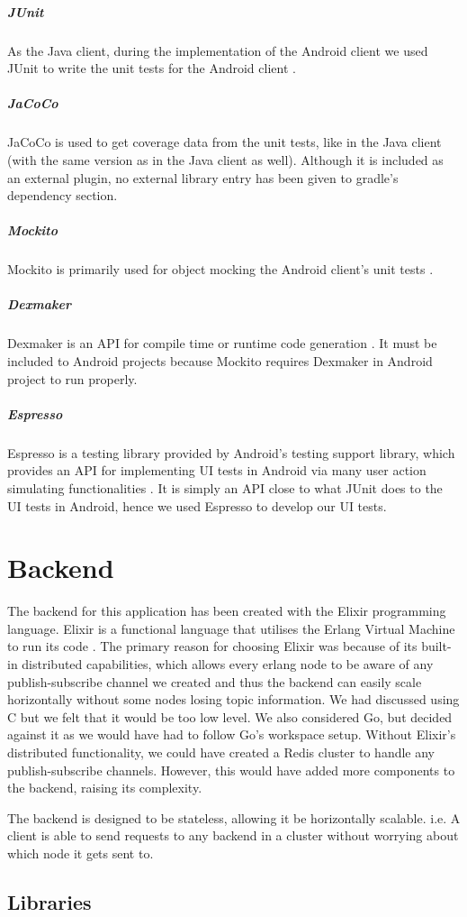 \documentclass[11pt,a4paper]{report}
\begin{document}
\subparagraph{JUnit}
As the Java client, during the implementation of the Android client we used JUnit to write the unit tests for the Android client \cite{website:junit_homepage}.
\subparagraph{JaCoCo}
JaCoCo is used to get coverage data from the unit tests, like in the Java client (with the same version as in the Java client as well). Although it is included as an external plugin, no external library entry has been given to gradle's dependency section.
\subparagraph{Mockito}
Mockito is primarily used for object mocking the Android client’s unit tests \cite {website:mockito_homepage}.
\subparagraph{Dexmaker}
Dexmaker is an API for compile time or runtime code generation \cite{website:dexmaker_homepage}. It must be included to Android projects because Mockito requires Dexmaker in Android project to run properly.
\subparagraph{Espresso}
Espresso is a testing library provided by Android’s testing support library, which provides an API for implementing UI tests in Android via many user action simulating functionalities \cite{website:espresso_homepage}. It is simply an API close to what JUnit does to the UI tests in Android, hence we used Espresso to develop our UI tests.

\section{Backend}

The backend for this application has been created with the Elixir programming language. Elixir is a functional language that utilises the Erlang Virtual Machine to run its code \cite{website:elixir_homepage}. The primary reason for choosing Elixir was because of its built-in distributed capabilities, which allows every erlang node to be aware of any publish-subscribe channel we created and thus the backend can easily scale horizontally without some nodes losing topic information. We had discussed using C but we felt that it would be too low level. We also considered Go, but decided against it as we would have had to follow Go's workspace setup.  Without Elixir's distributed functionality, we could have created a Redis cluster to handle any publish-subscribe channels. However, this would have added more components to the backend, raising its complexity.

The backend is designed to be stateless, allowing it be horizontally scalable. i.e. A client is able to send requests to any backend in a cluster without worrying about which node it gets sent to.

\subsection{Libraries}
\end{document}
